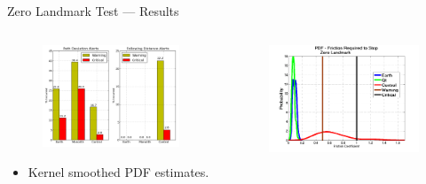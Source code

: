 \documentclass{beamer}
\begin{document}
    \begin{frame}{Zero Landmark Test --- Results}
      \begin{columns}
        \begin{column}{0.5\textwidth}
          \begin{figure}
            \includegraphics[width=\textwidth]{../graphics/zero_landmark_alert_percents.png}
          \end{figure}
          \begin{itemize} \scriptsize
            \item Kernel smoothed PDF estimates.
          \end{itemize}
        \end{column}
        \begin{column}{0.5\textwidth}
          \begin{figure}
            \includegraphics[width=\textwidth]{../graphics/zero_landmark_mu_distribution.png}

\end{figure}
\end{column}
\end{columns}
\end{frame}
\end{document}
